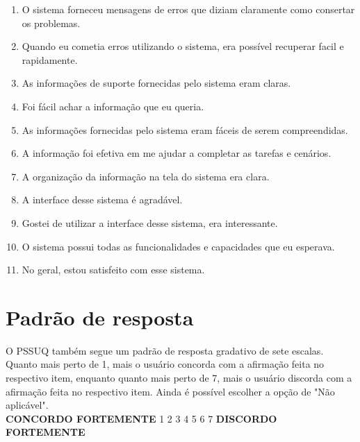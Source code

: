\begin{anexosenv}
\begin{enumerate}
	  \item O sistema forneceu mensagens de erros que diziam claramente como consertar os problemas.

	  \item Quando eu cometia erros utilizando o sistema, era possível recuperar facil e rapidamente.

	  \item As informações de suporte fornecidas pelo sistema eram claras.

	  \item Foi fácil achar a informação que eu queria.

	  \item As informações fornecidas pelo sistema eram fáceis de serem compreendidas.

	  \item A informação foi efetiva em me ajudar a completar as tarefas e cenários.

	  \item A organização da informação na tela do sistema era clara.

	  \item A interface desse sistema é agradável.

	  \item Gostei de utilizar a interface desse sistema, era interessante.

	  \item O sistema possui todas as funcionalidades e capacidades que eu esperava.

	  \item No geral, estou satisfeito com esse sistema.
	\end{enumerate}
      
      \section*{Padrão de resposta}
      
	O PSSUQ também segue um padrão de resposta gradativo de sete escalas. Quanto mais perto de 1, mais o usuário concorda com a 
	afirmação feita no respectivo item, enquanto quanto mais perto de 7, mais o usuário discorda com a afirmação feita no
	respectivo item. Ainda é possível escolher a opção de "Não aplicável".\\
            
	\noindent
	\textbf{CONCORDO FORTEMENTE}   1    2    3    4    5    6    7    \textbf{DISCORDO FORTEMENTE}
    
  
\end{anexosenv}

